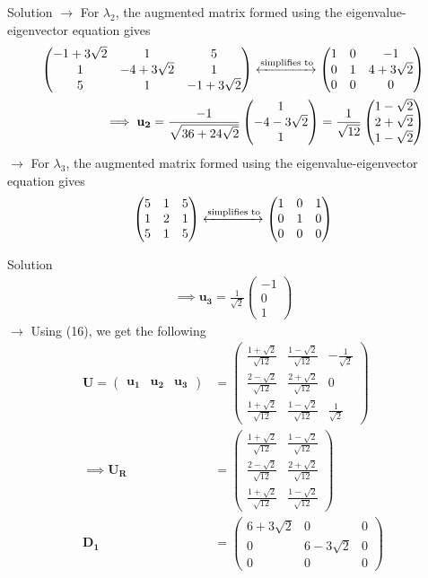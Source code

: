 \documentclass{beamer}
\numberwithin{equation}{section}
\theoremstyle{remark}
\newcommand{\myvec}[1]{\ensuremath{\begin{pmatrix}#1\end{pmatrix}}}
\let\vec\mathbf
\begin{document}
\begin{frame}{Solution}
$\rightarrow$ For $\lambda_2$, the augmented matrix formed using the eigenvalue-eigenvector equation gives
\begin{align}
    \myvec{-1+3\sqrt{2}&1&5\\1&-4+3\sqrt{2}&1\\5&1&-1+3\sqrt{2}}\xleftrightarrow{\text{simplifies to}}\myvec{1&0&-1\\0&1&4+3\sqrt{2}\\0&0&0} \\
    \implies \vec{u_2} = \frac{-1}{\sqrt{36+24\sqrt{2}}}\myvec{1\\-4-3\sqrt{2}\\1} = \frac{1}{\sqrt{12}}\myvec{1-\sqrt{2}\\2+\sqrt{2}\\1-\sqrt{2}}
\end{align}
$\rightarrow$ For $\lambda_3$, the augmented matrix formed using the eigenvalue-eigenvector equation gives
\begin{align}
    \myvec{5&1&5\\1&2&1\\5&1&5}\xleftrightarrow{\text{simplifies to}}\myvec{1&0&1\\0&1&0\\0&0&0}
\end{align}
\end{frame}

\begin{frame}{Solution}
\begin{align}
    \implies \vec{u_3} = \frac{1}{\sqrt{2}}\myvec{-1\\0\\1}
\end{align}
$\rightarrow$ Using (16), we get the following
\begin{align}
    \vec{U} = \myvec{\vec{u_1}&\vec{u_2}&\vec{u_3}} &= \myvec{\frac{1+\sqrt{2}}{\sqrt{12}}& \frac{1-\sqrt{2}}{\sqrt{12}}&-\frac{1}{\sqrt{2}}\\\frac{2-\sqrt{2}}{\sqrt{12}}&\frac{2+\sqrt{2}}{\sqrt{12}}&0\\\frac{1+\sqrt{2}}{\sqrt{12}}&\frac{1-\sqrt{2}}{\sqrt{12}}&\frac{1}{\sqrt{2}}} \\
    \implies \vec{U_R} &= \myvec{\frac{1+\sqrt{2}}{\sqrt{12}}&\frac{1-\sqrt{2}}{\sqrt{12}}\\\frac{2-\sqrt{2}}{\sqrt{12}}&\frac{2+\sqrt{2}}{\sqrt{12}}\\\frac{1+\sqrt{2}}{\sqrt{12}}&\frac{1-\sqrt{2}}{\sqrt{12}}} \\
    \vec{D_1} &= \myvec{6+3\sqrt{2}&0&0\\0&6-3\sqrt{2}&0\\0&0&0}
\end{align}
\end{frame}
\end{document}

